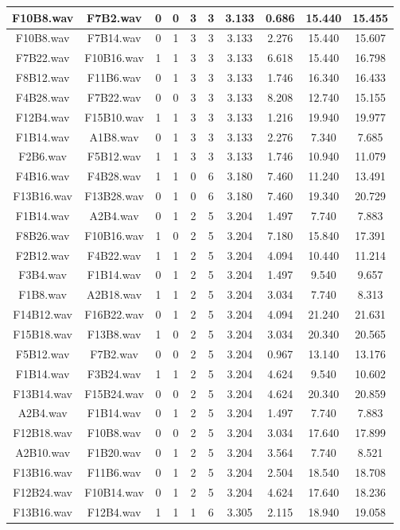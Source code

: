 \documentclass[11pt,a4paper]{book}
\begin{document}
\begin{longtable}[c]{|c|c|c|c|c|c|c|c|c|c|}
F10B8.wav&F7B2.wav&0&0&3&3&3.133&0.686&15.440&15.455\\ \hline
F10B8.wav&F7B14.wav&0&1&3&3&3.133&2.276&15.440&15.607\\ \hline
F7B22.wav&F10B16.wav&1&1&3&3&3.133&6.618&15.440&16.798\\ \hline
F8B12.wav&F11B6.wav&0&1&3&3&3.133&1.746&16.340&16.433\\ \hline
F4B28.wav&F7B22.wav&0&0&3&3&3.133&8.208&12.740&15.155\\ \hline
F12B4.wav&F15B10.wav&1&1&3&3&3.133&1.216&19.940&19.977\\ \hline
F1B14.wav&A1B8.wav&0&1&3&3&3.133&2.276&7.340&7.685\\ \hline
F2B6.wav&F5B12.wav&1&1&3&3&3.133&1.746&10.940&11.079\\ \hline
F4B16.wav&F4B28.wav&1&1&0&6&3.180&7.460&11.240&13.491\\ \hline
F13B16.wav&F13B28.wav&0&1&0&6&3.180&7.460&19.340&20.729\\ \hline
F1B14.wav&A2B4.wav&0&1&2&5&3.204&1.497&7.740&7.883\\ \hline
F8B26.wav&F10B16.wav&1&0&2&5&3.204&7.180&15.840&17.391\\ \hline
F2B12.wav&F4B22.wav&1&1&2&5&3.204&4.094&10.440&11.214\\ \hline
F3B4.wav&F1B14.wav&0&1&2&5&3.204&1.497&9.540&9.657\\ \hline
F1B8.wav&A2B18.wav&1&1&2&5&3.204&3.034&7.740&8.313\\ \hline
F14B12.wav&F16B22.wav&0&1&2&5&3.204&4.094&21.240&21.631\\ \hline
F15B18.wav&F13B8.wav&1&0&2&5&3.204&3.034&20.340&20.565\\ \hline
F5B12.wav&F7B2.wav&0&0&2&5&3.204&0.967&13.140&13.176\\ \hline
F1B14.wav&F3B24.wav&1&1&2&5&3.204&4.624&9.540&10.602\\ \hline
F13B14.wav&F15B24.wav&0&0&2&5&3.204&4.624&20.340&20.859\\ \hline
A2B4.wav&F1B14.wav&0&1&2&5&3.204&1.497&7.740&7.883\\ \hline
F12B18.wav&F10B8.wav&0&0&2&5&3.204&3.034&17.640&17.899\\ \hline
A2B10.wav&F1B20.wav&0&1&2&5&3.204&3.564&7.740&8.521\\ \hline
F13B16.wav&F11B6.wav&0&1&2&5&3.204&2.504&18.540&18.708\\ \hline
F12B24.wav&F10B14.wav&0&1&2&5&3.204&4.624&17.640&18.236\\ \hline
F13B16.wav&F12B4.wav&1&1&1&6&3.305&2.115&18.940&19.058\\ \hline

\end{longtable}
\end{document}
